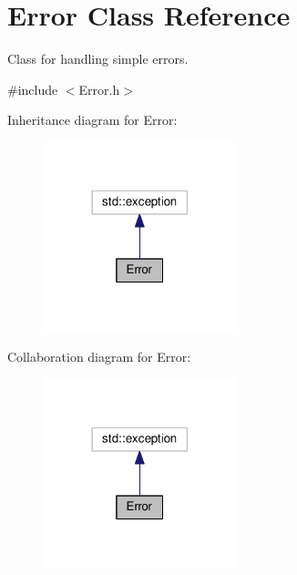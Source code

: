 \hypertarget{classError}{}\section{Error Class Reference}
\label{classError}


Class for handling simple errors.  




{\ttfamily \#include $<$Error.\+h$>$}



Inheritance diagram for Error\+:
\nopagebreak
\begin{figure}[H]
\begin{center}
\leavevmode
\includegraphics[width=158pt]{classError__inherit__graph}
\end{center}
\end{figure}


Collaboration diagram for Error\+:
\nopagebreak
\begin{figure}[H]
\begin{center}
\leavevmode
\includegraphics[width=158pt]{classError__coll__graph}
\end{center}
\end{figure}
